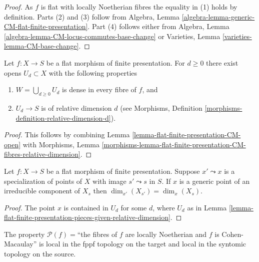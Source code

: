 \begin{proof}
As $f$ is flat with locally Noetherian fibres the equality in (1) holds
by definition. Parts (2) and (3) follow from
Algebra, Lemma \ref{algebra-lemma-generic-CM-flat-finite-presentation}.
Part (4) follows either from
Algebra, Lemma \ref{algebra-lemma-CM-locus-commutes-base-change}
or
Varieties, Lemma \ref{varieties-lemma-CM-base-change}.
\end{proof}

\begin{lemma}
\label{lemma-flat-finite-presentation-pieces-given-relative-dimension}
Let $f : X \to S$ be a flat morphism of finite presentation.
For $d \geq 0$ there exist opens $U_d \subset X$ with the following
properties
\begin{enumerate}
\item $W = \bigcup_{d \geq 0} U_d$ is dense in every fibre of $f$, and
\item $U_d \to S$ is of relative dimension $d$ (see
Morphisms, Definition \ref{morphisms-definition-relative-dimension-d}).
\end{enumerate}
\end{lemma}

\begin{proof}
This follows by combining
Lemma \ref{lemma-flat-finite-presentation-CM-open}
with
Morphisms, Lemma
\ref{morphisms-lemma-flat-finite-presentation-CM-fibres-relative-dimension}.
\end{proof}

\begin{lemma}
\label{lemma-flat-finite-presentation-specialization-dimension}
Let $f : X \to S$ be a flat morphism of finite presentation.
Suppose $x' \leadsto x$ is a specialization of points of $X$
with image $s' \leadsto s$ in $S$. If $x$ is a generic point of an
irreducible component of $X_s$ then $\dim_{x'}(X_{s'}) = \dim_x(X_s)$.
\end{lemma}

\begin{proof}
The point $x$ is contained in $U_d$ for some $d$, where $U_d$ as in
Lemma \ref{lemma-flat-finite-presentation-pieces-given-relative-dimension}.
\end{proof}

\begin{lemma}
\label{lemma-CM-local-source-and-target}
The property
$\mathcal{P}(f)=$``the fibres of $f$ are locally Noetherian and $f$ is
Cohen-Macaulay'' is local in the fppf topology on the target and
local in the syntomic topology on the source.
\end{lemma}

